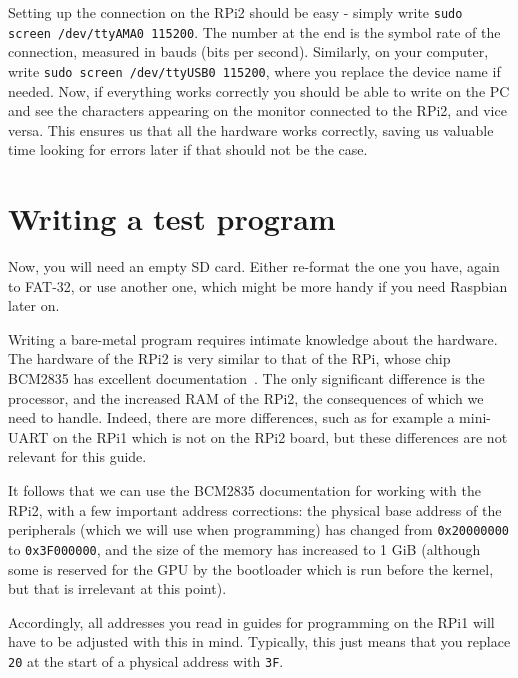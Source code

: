\documentclass[a4paper,11pt,reqno]{amsart}
\begin{document}
Setting up the connection on the RPi2 should be easy - simply write \texttt{sudo screen /dev/ttyAMA0 115200}. The number at the end is the symbol rate of the connection, measured in bauds (bits per second). Similarly, on your computer, write \texttt{sudo screen /dev/ttyUSB0 115200}, where you replace the device name if needed. Now, if everything works correctly you should be able to write on the PC and see the characters appearing on the monitor connected to the RPi2, and vice versa. This ensures us that all the hardware works correctly, saving us valuable time looking for errors later if that should not be the case.

\section{Writing a test program}
Now, you will need an empty SD card. Either re-format the one you have, again to FAT-32, or use another one, which might be more handy if you need Raspbian later on.

Writing a bare-metal program requires intimate knowledge about the hardware. The hardware of the RPi2 is very similar to that of the RPi, whose chip BCM2835 has excellent documentation~\cite{bcm2835}. The only significant difference is the processor, and the increased RAM of the RPi2, the consequences of which we need to handle. Indeed, there are more differences, such as for example a mini-UART on the RPi1 which is not on the RPi2 board, but these differences are not relevant for this guide.

It follows that we can use the BCM2835 documentation for working with the RPi2, with a few important address corrections: the physical base address of the peripherals (which we will use when programming) has changed from \texttt{0x20000000} to \texttt{0x3F000000}, and the size of the memory has increased to 1 GiB (although some is reserved for the GPU by the bootloader which is run before the kernel, but that is irrelevant at this point).

Accordingly, all addresses you read in guides for programming on the RPi1 will have to be adjusted with this in mind. Typically, this just means that you replace \texttt{20} at the start of a physical address with \texttt{3F}.
\end{document}
